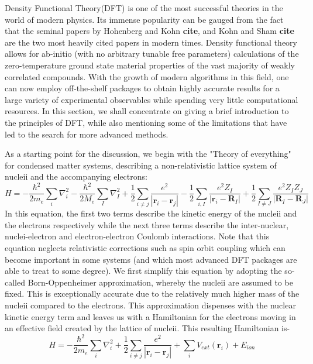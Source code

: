 \documentclass[12pt,letter]{article}
\newcommand{\rmb}{\mathbf{r}}
\begin{document}
Density Functional Theory(DFT) is one of the most successful theories in the world of modern physics. Its immense popularity can be gauged from the fact that the seminal papers  by Hohenberg and Kohn \textbf{cite}, and Kohn and Sham \textbf{cite} are the two most heavily cited papers in modern times. Density functional theory allows for ab-initio (with no arbitrary tunable free parameters) calculations of the zero-temperature ground state material properties of the vast majority of weakly correlated compounds. With the growth of modern algorithms in this field, one can now employ off-the-shelf packages to obtain highly accurate results for a large variety of experimental observables while spending very little computational resources. In this section, we shall concentrate on giving a brief introduction to the principles of DFT, while also mentioning some of the limitations that have led to the search for more advanced methods.

As a starting point for the discussion, we begin with the "Theory of everything" for condensed matter systems, describing a non-relativistic lattice system of nucleii and the accompanying electrons:
\begin{equation}\label{DFT_1}
H=-\dfrac{\hbar^2}{2m_e}\sum_i\nabla_i^2  -\dfrac{\hbar^2}{2M_e}\sum_I\nabla_I^2 +\dfrac{1}{2}\sum_{i\neq j} \dfrac{e^2}{|\rmb_i -\rmb_j|}-\dfrac{1}{2}\sum_{i, I} \dfrac{e^2Z_I}{|\rmb_i -\mathbf{R}_I|} + \dfrac{1}{2}\sum_{I\neq J} \dfrac{e^2Z_I Z_J}{|\mathbf{R}_I -\mathbf{R}_J|} 
\end{equation}
In this equation, the first two terms describe the kinetic energy of the nucleii and the electrons respectively while the next three terms describe the inter-nuclear, nuclei-electron and electron-electron Coulomb interactions. Note that this equation neglects relativistic corrections such as spin orbit coupling which can become important in some systems (and which most advanced DFT packages are able to treat to some degree). We first simplify this equation by adopting the so-called Born-Oppenheimer approximation, whereby the nucleii are assumed to be fixed. This is exceptionally accurate due to the relatively much higher mass of the nucleii compared to the electrons. This approximation dispenses with the nuclear kinetic energy term and leaves us with a Hamiltonian for the electrons moving in an effective field created by the lattice of nucleii. This resulting Hamiltonian is-
\begin{equation}\label{DFT_2}
H=-\dfrac{\hbar^2}{2m_e}\sum_i\nabla_i^2 + \dfrac{1}{2}\sum_{i\neq j} \dfrac{e^2}{|\rmb_i -\rmb_j|} +\sum_i V_{ext}(\rmb_i) +E_{ion}
\end{equation}
\end{document}
